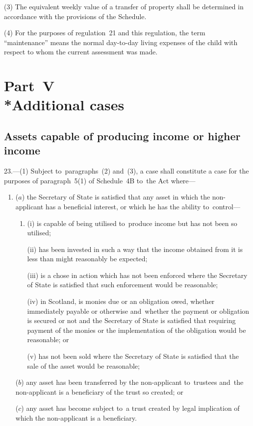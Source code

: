 \documentclass[12pt,a4paper]{article}
\begin{document}
(3) The equivalent weekly value of a transfer of property shall be determined in
accordance with the provisions of the Schedule.

(4) For the purposes of regulation~21 and this regulation, the term
“maintenance” means the normal day-to-day living expenses of the child with
respect to whom the current assessment was made.


\section[Part~V --- Additional cases]{Part~V\\*Additional cases}

\renewcommand\parthead{--- Part~V}

\subsection[23. Assets capable of producing income or higher income]{Assets capable of producing income or higher income}

23.—(1)
Subject to~paragraphs~(2) and~(3), a case shall constitute a case for the
purposes of paragraph~5(1) of Schedule~4B to~the Act where—
\begin{enumerate}\item[]
($a$) the Secretary of State is satisfied that any asset in which the non-applicant
has a beneficial interest, or which he has the ability to~control—
\begin{enumerate}\item[]
(i) is capable of being utilised to~produce income but has not been so utilised;

(ii) has been invested in such a way that the income obtained from it is less
than might reasonably be expected;

(iii) is a chose in action which has not been enforced where the Secretary of
State is satisfied that such enforcement would be reasonable;

(iv) in Scotland, is monies due or an obligation owed, whether immediately
payable or otherwise and~whether the payment or obligation is secured or not and
the Secretary of State is satisfied that requiring payment of the monies or the
implementation of the obligation would be reasonable; or

(v) has not been sold where the Secretary of State is satisfied that the sale of
the asset would be reasonable;
\end{enumerate}

($b$) any asset has been transferred by the non-applicant to~trustees and~the
non-applicant is a beneficiary of the trust so created; or

($c$) any asset has become subject to~a trust created by legal implication of which
the non-applicant is a beneficiary.
\end{enumerate}
\end{document}
